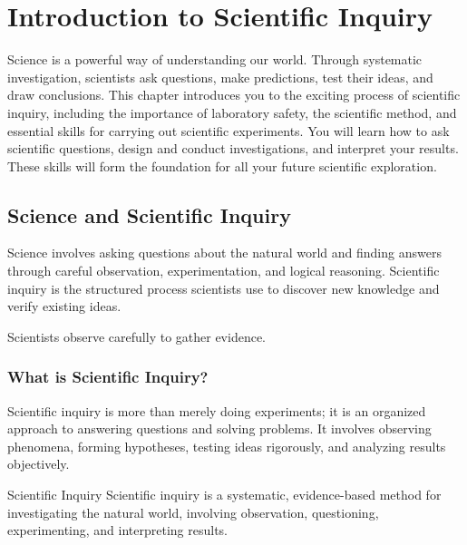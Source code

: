 \chapter{Introduction to Scientific Inquiry}

Science is a powerful way of understanding our world. Through systematic investigation, scientists ask questions, make predictions, test their ideas, and draw conclusions. This chapter introduces you to the exciting process of scientific inquiry, including the importance of laboratory safety, the scientific method, and essential skills for carrying out scientific experiments. You will learn how to ask scientific questions, design and conduct investigations, and interpret your results. These skills will form the foundation for all your future scientific exploration.

\section{Science and Scientific Inquiry}

Science involves asking questions about the natural world and finding answers through careful observation, experimentation, and logical reasoning. Scientific inquiry is the structured process scientists use to discover new knowledge and verify existing ideas.

\begin{marginfigure}
  \caption{Scientists observe carefully to gather evidence.}
  \label{fig:scientist_observe}
\end{marginfigure}

\subsection{What is Scientific Inquiry?}

Scientific inquiry is more than merely doing experiments; it is an organized approach to answering questions and solving problems. It involves observing phenomena, forming hypotheses, testing ideas rigorously, and analyzing results objectively.

\begin{keyconcept}{Scientific Inquiry}
Scientific inquiry is a systematic, evidence-based method for investigating the natural world, involving observation, questioning, experimenting, and interpreting results.
\end{keyconcept}

